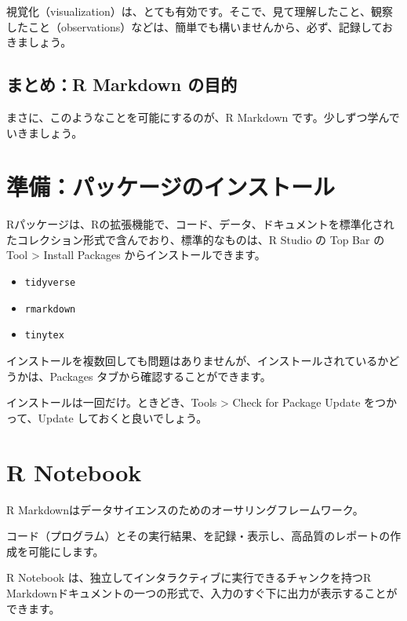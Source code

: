 \documentclass[
  xelatex, ja=standard]{bxjsbook}
\providecommand{\tightlist}{%
  \setlength{\itemsep}{0pt}\setlength{\parskip}{0pt}}
\theoremstyle{definition}
\theoremstyle{definition}
\theoremstyle{definition}
\theoremstyle{definition}
\theoremstyle{remark}
\begin{document}
視覚化（visualization）は、とても有効です。そこで、見て理解したこと、観察したこと（observations）などは、簡単でも構いませんから、必ず、記録しておきましょう。

\hypertarget{ux307eux3068ux3081r-markdown-ux306eux76eeux7684}{%
\subsection{まとめ：R Markdown の目的}\label{ux307eux3068ux3081r-markdown-ux306eux76eeux7684}}

まさに、このようなことを可能にするのが、R Markdown です。少しずつ学んでいきましょう。

\hypertarget{ux6e96ux5099ux30d1ux30c3ux30b1ux30fcux30b8ux306eux30a4ux30f3ux30b9ux30c8ux30fcux30eb}{%
\section{準備：パッケージのインストール}\label{ux6e96ux5099ux30d1ux30c3ux30b1ux30fcux30b8ux306eux30a4ux30f3ux30b9ux30c8ux30fcux30eb}}

Rパッケージは、Rの拡張機能で、コード、データ、ドキュメントを標準化されたコレクション形式で含んでおり、標準的なものは、R Studio の Top Bar の Tool \textgreater{} Install Packages からインストールできます。

\begin{itemize}
\tightlist
\item
  \texttt{tidyverse}
\item
  \texttt{rmarkdown}
\item
  \texttt{tinytex}
\end{itemize}

インストールを複数回しても問題はありませんが、インストールされているかどうかは、Packages タブから確認することができます。

インストールは一回だけ。ときどき、Tools \textgreater{} Check for Package Update をつかって、Update しておくと良いでしょう。

\hypertarget{r-notebook}{%
\section{R Notebook}\label{r-notebook}}

R Markdownはデータサイエンスのためのオーサリングフレームワーク。

コード（プログラム）とその実行結果、を記録・表示し、高品質のレポートの作成を可能にします。

R Notebook は、独立してインタラクティブに実行できるチャンクを持つR Markdownドキュメントの一つの形式で、入力のすぐ下に出力が表示することができます。
\end{document}
